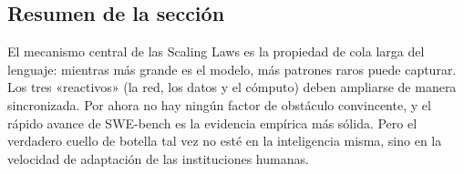 \subsection{Resumen de la sección}

El mecanismo central de las Scaling Laws es la propiedad de cola larga del lenguaje: mientras más grande es el modelo, más patrones raros puede capturar. Los tres «reactivos» (la red, los datos y el cómputo) deben ampliarse de manera sincronizada. Por ahora no hay ningún factor de obstáculo convincente, y el rápido avance de SWE-bench es la evidencia empírica más sólida. Pero el verdadero cuello de botella tal vez no esté en la inteligencia misma, sino en la velocidad de adaptación de las instituciones humanas.
